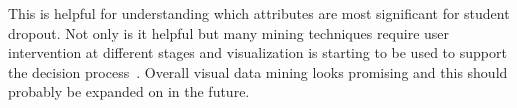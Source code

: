 \bigskip\noindent
This is helpful for understanding which attributes are most significant for student dropout. 
Not only is it helpful but many mining techniques require user intervention at different stages and visualization is starting to be used to support the decision process~\cite{1207445}.
Overall visual data mining looks promising and this should probably be expanded on in the future.
